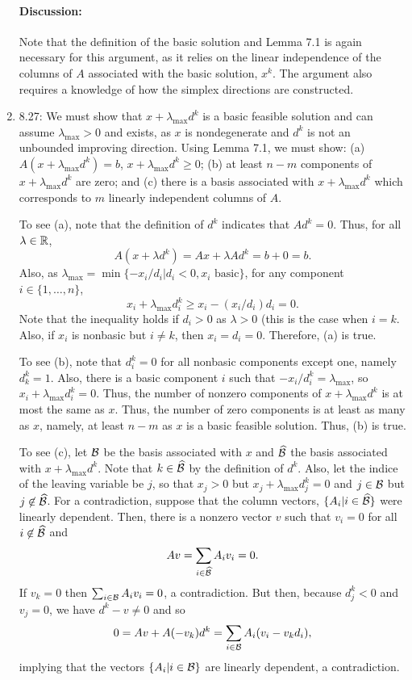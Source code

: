 \documentclass[10pt]{article}
\begin{document}
\begin{enumerate}
  \medskip

  \paragraph{Discussion:} Note that the definition of the basic
  solution and Lemma 7.1 is again necessary for this argument, as it relies
  on the linear independence of the columns of $A$ associated with the
  basic solution, $x^k$. The argument also requires a knowledge of how
  the simplex directions are constructed.


\item 8.27: We must show that $x + \lambda_{\max} d^k$ is a basic
  feasible solution and can assume $\lambda_{\max} > 0$ and exists, as
  $x$ is nondegenerate and $d^k$ is not an unbounded improving
  direction. Using Lemma 7.1, we must show: (a) $A(x + \lambda_{\max}
  d^k) = b$, $x + \lambda_{\max} d^k \geq 0$; (b) at least $n-m$
  components of $x + \lambda_{\max} d^k$ are zero; and (c) there is a basis
  associated with $x + \lambda_{\max} d^k$ which corresponds to $m$
  linearly independent columns of $A$.

  To see (a), note that the definition of $d^k$ indicates that $A d^k
  = 0$. Thus, for all $\lambda \in {\mathbb R}$, 
  \[
  A (x + \lambda d^k) = A x + \lambda Ad^k = b + 0 = b.
  \]
  Also, as $\lambda_{\max} = \min\{ -x_i/d_i | d_i < 0, x_i \mbox{ basic}\}$, for any component $i \in
  \{1,\ldots,n\}$,
  \[
  x_i + \lambda_{\max} d^k_i \geq x_i - (x_i/d_i) d_i = 0.
  \]
  Note that the inequality holds if $d_i > 0$ as $\lambda > 0$ (this
  is the case when $i = k$. Also, if $x_i$ is nonbasic but $i \not=
  k$, then $x_i = d_i = 0$. Therefore, (a) is true.

  To see (b), note that $d^k_i = 0$ for all nonbasic components except
  one, namely $d^k_k = 1$. Also, there is a basic component $i$ such
  that $-x_i/d^k_i = \lambda_{\max}$, so $x_i + \lambda_{\max} d^k_i =
  0$. Thus, the number of nonzero components of $x + \lambda_{\max} d^k$
  is at most the same as $x$. Thus, the number of zero components is
  at least as many as $x$, namely, at least $n-m$ as $x$ is a basic
  feasible solution. Thus, (b) is true.

  To see (c), let ${\cal B}$ be the basis associated with $x$ and $\widehat{{\cal B}}$
  the basis associated with $x + \lambda_{\max} d^k$. Note that $k \in
  \widehat{{\cal B}}$ by the definition of $d^k$. Also, let the indice of the
  leaving variable be $j$, so that $x_j > 0$ but $x_j + \lambda_{\max}
  d^k_j = 0$ and $j \in {\cal B}$ but $j \not\in \widehat{{\cal B}}$. For a
  contradiction, suppose that the column vectors, $\{A_i | i \in \widehat{{\cal B}}\}$ were linearly dependent. Then, there is a
  nonzero vector $v$ such that $v_i = 0$ for all $i \not\in \widehat{{\cal B}}$ and
  \[
  A v = \sum_{i \in \widehat{{\cal B}}} A_i v_i = 0.
  \]
  If $v_k = 0$ then $\sum_{i \in {\cal B}} A_i v_i = 0$, a
  contradiction. But then, because $d^k_j < 0$ and $v_j = 0$, 
  we have $d^k - v \not= 0$ and so
  \[
  0 = A v + A(-v_k) d^k = \sum_{i \in {\cal B}} A_i (v_i - v_k d_i),
  \]
  implying that the vectors $\{A_i | i \in {\cal B}\}$ are linearly
  dependent, a contradiction.


\end{enumerate}
\end{document}
